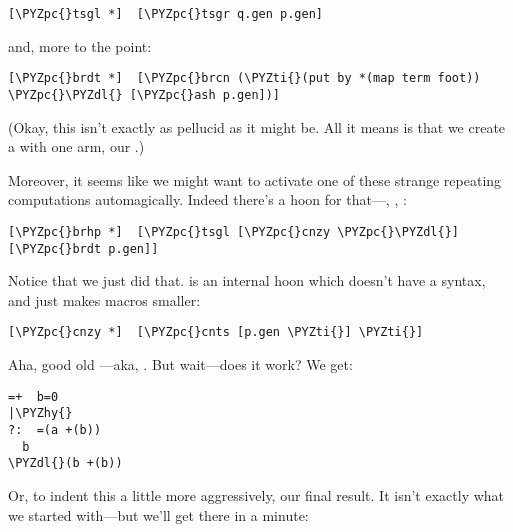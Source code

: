 \begin{framed_shaded}
\begin{Verbatim}[fontsize=\relsize{-2.5},fontseries=b,commandchars=\\\{\}]
[\PYZpc{}tsgl *]  [\PYZpc{}tsgr q.gen p.gen]
\end{Verbatim}
\end{framed_shaded}
and, more to the point:

\begin{framed_shaded}
\begin{Verbatim}[fontsize=\relsize{-2.5},fontseries=b,commandchars=\\\{\}]
[\PYZpc{}brdt *]  [\PYZpc{}brcn (\PYZti{}(put by *(map term foot)) \PYZpc{}\PYZdl{} [\PYZpc{}ash p.gen])]
\end{Verbatim}
\end{framed_shaded}
(Okay, this isn't exactly as pellucid as it might be.  All it
means is that we create a \kode{\textbar{}\%} with one arm, our \kode{\%\$}.)

Moreover, it seems like we might want to activate one of these
strange repeating computations automagically.  Indeed there's a
hoon for that---\kode{\textbar{}-}, , :

\begin{framed_shaded}
\begin{Verbatim}[fontsize=\relsize{-2.5},fontseries=b,commandchars=\\\{\}]
[\PYZpc{}brhp *]  [\PYZpc{}tsgl [\PYZpc{}cnzy \PYZpc{}\PYZdl{}] [\PYZpc{}brdt p.gen]]
\end{Verbatim}
\end{framed_shaded}
Notice that we just did that.   is an internal hoon which
doesn't have a syntax, and just makes macros smaller:

\begin{framed_shaded}
\begin{Verbatim}[fontsize=\relsize{-2.5},fontseries=b,commandchars=\\\{\}]
[\PYZpc{}cnzy *]  [\PYZpc{}cnts [p.gen \PYZti{}] \PYZti{}]
\end{Verbatim}
\end{framed_shaded}
Aha, good old ---aka, \kode{\%=}.  But wait---does it work?
We get:

\begin{framed_shaded}
\begin{Verbatim}[fontsize=\relsize{-2.5},fontseries=b,commandchars=\\\{\}]
=+  b=0
|\PYZhy{}
?:  =(a +(b))
  b
\PYZdl{}(b +(b))
\end{Verbatim}
\end{framed_shaded}
Or, to indent this a little more aggressively, our final result.
It isn't exactly what we started with---but we'll get there in 
a minute:


